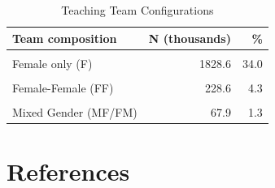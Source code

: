 \documentclass[
  12pt,
]{article}
\let\oldsection\section
\renewcommand{\section}{\clearpage\oldsection}
\begin{document}
\begin{table}[!h]
\centering
\caption{\label{tab:SI-composition}Teaching Team Configurations}
\centering
\fontsize{10}{12}\selectfont
\begin{tabular}[t]{lrr}
\toprule
Team composition & N (thousands) & \%\\
\midrule
\cellcolor{gray!10}{Male only (M)} & \cellcolor{gray!10}{2587.6} & \cellcolor{gray!10}{48.1}\\
Female only (F) & 1828.6 & 34.0\\
\cellcolor{gray!10}{Male-Male (MM)} & \cellcolor{gray!10}{349.6} & \cellcolor{gray!10}{6.5}\\
Female-Female (FF) & 228.6 & 4.3\\
\cellcolor{gray!10}{Mixed Gender (MF/FM)} & \cellcolor{gray!10}{83.4} & \cellcolor{gray!10}{1.6}\\
Mixed Gender (MF/FM) & 67.9 & 1.3\\
\bottomrule
\end{tabular}
\end{table}

\processdelayedfloats
\clearpage
\singlespacing

\section*{References}\label{references}
\end{document}
